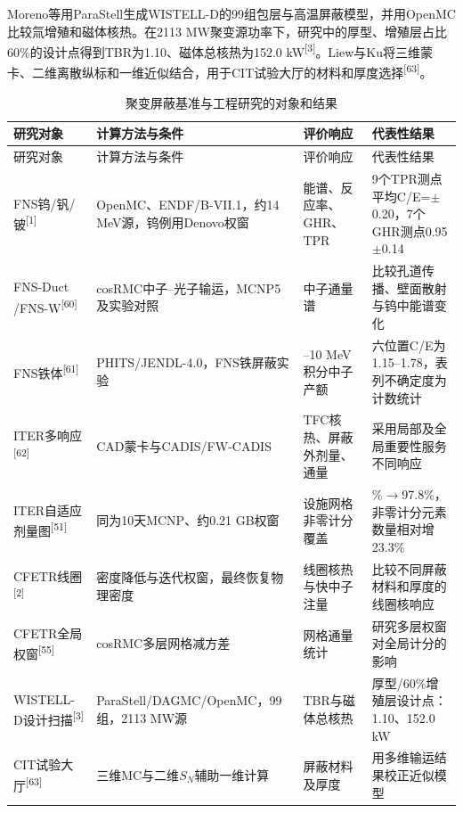 \documentclass[UTF8, zihao=-4, fontset=none, a4paper]{ctexart}
\newcommand{\upcite}[1]{\textsuperscript{[#1]}}
\begin{document}
Moreno等用ParaStell生成WISTELL-D的99组包层与高温屏蔽模型，并用OpenMC比较氚增殖和磁体核热。在2113 MW聚变源功率下，研究中的厚型、增殖层占比60\%的设计点得到TBR为1.10、磁体总核热为152.0 kW\upcite{3}。Liew与Ku将三维蒙卡、二维离散纵标和一维近似结合，用于CIT试验大厅的材料和厚度选择\upcite{63}。
\begin{longtable}{@{}>{\raggedright\arraybackslash}p{}>{\raggedright\arraybackslash}p{}>{\raggedright\arraybackslash}p{}>{\raggedright\arraybackslash}p{}@{}}
\caption{聚变屏蔽基准与工程研究的对象和结果}\label{tab:5}\\
\toprule
研究对象 & 计算方法与条件 & 评价响应 & 代表性结果 \\
\midrule
\endfirsthead
\toprule
研究对象 & 计算方法与条件 & 评价响应 & 代表性结果 \\
\midrule
\endhead
\bottomrule
\endlastfoot
FNS钨/钒/铍\upcite{1} & OpenMC、ENDF/B-VII.1，约14 MeV源，钨例用Denovo权窗 & 能谱、反应率、GHR、TPR & 9个TPR测点平均C/E=\allowbreak1.03$\pm$0.20，7个GHR测点0.95$\pm$0.14 \\
FNS-Duct /\newline FNS-W\upcite{60} & cosRMC中子--光子输运，MCNP5及实验对照 & 中子通量谱 & 比较孔道传播、壁面散射与钨中能谱变化 \\
FNS铁体\upcite{61} & PHITS/JENDL-4.0，FNS铁屏蔽实验 & 0.003--10 MeV积分中子产额 & 六位置C/E为1.15--1.78，表列不确定度为计数统计 \\
ITER多响应\upcite{62} & CAD蒙卡与CADIS/FW-CADIS & TFC核热、屏蔽外剂量、通量 & 采用局部及全局重要性服务不同响应 \\
ITER自适应剂量图\upcite{51} & 同为10天MCNP、约0.21 GB权窗 & 设施网格非零计分覆盖 & 79.3\%$\rightarrow$97.8\%，非零计分元素数量相对增23.3\% \\
CFETR线圈\upcite{2} & 密度降低与迭代权窗，最终恢复物理密度 & 线圈核热与快中子注量 & 比较不同屏蔽材料和厚度的线圈核响应 \\
CFETR全局权窗\upcite{55} & cosRMC多层网格减方差 & 网格通量统计 & 研究多层权窗对全局计分的影响 \\
WISTELL-D设计扫描\upcite{3} & ParaStell/DAGMC/OpenMC，99组，2113 MW源 & TBR与磁体总核热 & 厚型/60\%增殖层设计点：1.10、152.0 kW \\
CIT试验大厅\upcite{63} & 三维MC与二维$S_N$辅助一维计算 & 屏蔽材料及厚度 & 用多维输运结果校正近似模型 \\
\end{longtable}
\end{document}
